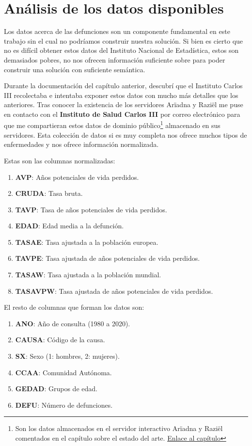 \chapter{Análisis de los datos disponibles}

Los datos acerca de las defunciones son un componente fundamental en este trabajo sin el cual no podríamos construir nuestra solución. Si bien es cierto que no es difícil obtener estos datos del Instituto Nacional de Estadística, estos son demasiados pobres, no nos ofrecen información suficiente sobre para poder construir una solución con suficiente semántica.

Durante la documentación del capítulo anterior, descubrí que el Instituto Carlos III recolectaba e intentaba exponer estos datos con mucho más detalles que los anteriores. Tras conocer la existencia de los servidores Arïadna y Raziël me puse en contacto con el \textbf{Instituto de Salud Carlos III} por correo electrónico para que me compartieran estos datos de dominio público\footnote{Son los datos almacenados en el servidor interactivo Arïadna y Raziël comentados en el capítulo sobre el estado del arte. \hyperref[sec:estadoArte]{Enlace al capítulo}} almacenado en sus servidores. Esta colección de datos si es muy completa nos ofrece muchos tipos de enfermedades y nos ofrece información normalizada.

Estas son las columnas normalizadas:
\begin{enumerate}
\item \textbf{AVP}: Años potenciales de vida perdidos.
\item \textbf{CRUDA}: Tasa bruta.
\item \textbf{TAVP}: Tasa de años potenciales de vida perdidos.
\item \textbf{EDAD}: Edad media a la defunción.
\item \textbf{TASAE}: Tasa ajustada a la población europea.
\item \textbf{TAVPE}: Tasa ajustada de años potenciales de vida perdidos.
\item \textbf{TASAW}: Tasa ajustada a la población mundial.
\item \textbf{TASAVPW}: Tasa ajustada de años potenciales de vida perdidos.
\end{enumerate}

El resto de columnas que forman los datos son:
\begin{enumerate}
\item \textbf{ANO}: Año de consulta (1980 a 2020).
\item \textbf{CAUSA}: Código de la causa.
\item \textbf{SX}: Sexo (1: hombres, 2: mujeres).
\item \textbf{CCAA}: Comunidad Autónoma.
\item \textbf{GEDAD}: Grupos de edad.
\item \textbf{DEFU}: Número de defunciones.
\end{enumerate}

